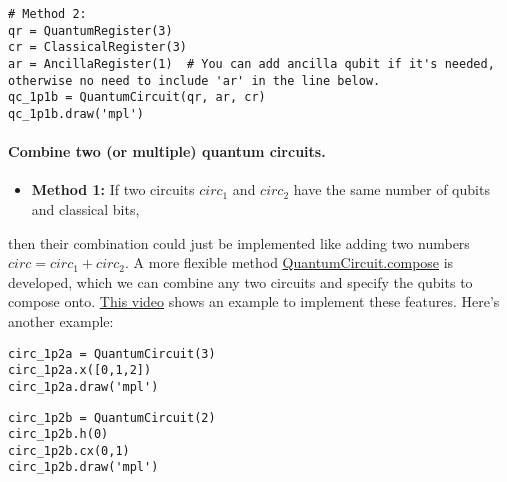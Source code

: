 \documentclass[%
oneside,                 %
final,                   %
10pt]{article}
\begin{document}
\begin{verbatim}
# Method 2: 
qr = QuantumRegister(3)
cr = ClassicalRegister(3)
ar = AncillaRegister(1)  # You can add ancilla qubit if it's needed, otherwise no need to include 'ar' in the line below.
qc_1p1b = QuantumCircuit(qr, ar, cr)
qc_1p1b.draw('mpl')

\end{verbatim}


\paragraph{Combine two (or multiple) quantum circuits.}
\begin{itemize}
\item \textbf{Method 1:} If two circuits $circ_1$ and $circ_2$ have the same number of qubits and classical bits,
\end{itemize}

\noindent
then their combination could just be implemented like adding two numbers $circ = circ_1 + circ_2$. A more flexible method
\href{{https://qiskit.org/documentation/stubs/qiskit.circuit.QuantumCircuit.compose.html#qiskit.circuit.QuantumCircuit.compose}}{QuantumCircuit.compose}
is developed, which we can combine any two circuits and specify the qubits to compose onto. \href{{https://www.youtube.com/watch?v=3ja8uCqUS0s}}{This video} shows an example to implement these features. Here's another example:





\begin{verbatim}
circ_1p2a = QuantumCircuit(3)
circ_1p2a.x([0,1,2])
circ_1p2a.draw('mpl')

\end{verbatim}







\begin{verbatim}
circ_1p2b = QuantumCircuit(2)
circ_1p2b.h(0)
circ_1p2b.cx(0,1)
circ_1p2b.draw('mpl')

\end{verbatim}
\end{document}
